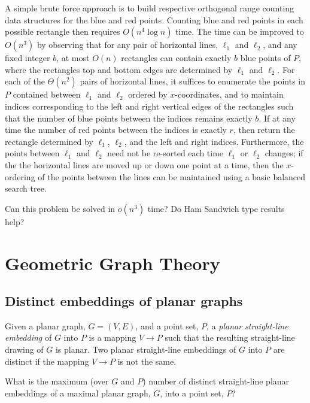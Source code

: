 \documentclass{patmorin}
\newcommand{\poser}[1]{\noindent{\textit{#1}}}
\begin{document}
A simple brute force approach is to build respective orthogonal range
counting data structures for the blue and red points.  Counting blue and
red points in each possible rectangle then requires $O(n^4 \log n)$ time.
The time can be improved to $O(n^3)$ by observing that for any pair
of horizontal lines, $\ell_1$ and $\ell_2$, and any fixed integer $b$,
at most $O(n)$ rectangles can contain exactly $b$ blue points of $P$,
where the rectangles top and bottom edges are determined by $\ell_1$
and $\ell_2$.  For each of the $\Theta(n^2)$ pairs of horizontal lines,
it suffices to enumerate the points in $P$ contained between $\ell_1$ and
$\ell_2$ ordered by $x$-coordinates, and to maintain indices corresponding
to the left and right vertical edges of the rectangles such that the
number of blue points between the indices remains exactly $b$.  If at
any time the number of red points between the indices is exactly $r$,
then return the rectangle determined by $\ell_1$, $\ell_2$, and the
left and right indices.  Furthermore, the points between $\ell_1$ and
$\ell_2$ need not be re-sorted each time $\ell_1$ or $\ell_2$ changes;
if the the horizontal lines are moved up or down one point at a time,
then the $x$-ordering of the points between the lines can be maintained
using a basic balanced search tree.

Can this problem be solved in $o(n^3)$ time?  Do Ham Sandwich type
results help?




\section{Geometric Graph Theory}

\subsection{Distinct embeddings of planar graphs}

\poser{Fabrizio Frati}

Given a planar graph, $G=(V,E)$, and a point set, $P$, a \emph{planar
straight-line embedding} of $G$ into $P$ is a mapping $V\to P$ such
that the resulting straight-line drawing of $G$ is planar.  Two planar
straight-line embeddings of $G$ into $P$ are distinct if the mapping
$V\to P$ is not the same.


\begin{op}
  What is the maximum (over $G$ and $P$) number of distinct straight-line
  planar embeddings of a maximal planar graph, $G$, into a point set, $P$?
\end{op}
\end{document}
